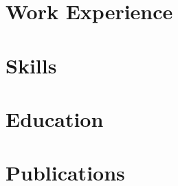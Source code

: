 \documentclass[a4paper,10pt]{article}
\begin{document}
\section{Work Experience}


\section{Skills}


%

\section{Education}


\section{Publications}
 

%
\end{document}
